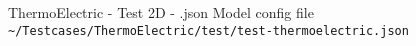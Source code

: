 \begin{frame}{ThermoElectric - Test 2D - .json}
Model config file \lstinline{~/Testcases/ThermoElectric/test/test-thermoelectric.json}
\vspace{5mm}

\end{frame}


